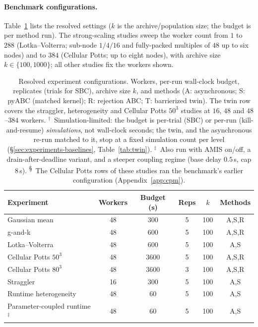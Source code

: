 \documentclass[pdflatex,sn-mathphys-num]{sn-jnl}
\theoremstyle{plain}
\theoremstyle{definition}
\begin{document}
\begin{appendices}
\paragraph{Benchmark configurations.} Table~\ref{tab:configs} lists the resolved settings ($k$ is the archive/population size; the budget is per method run). The strong-scaling studies sweep the worker count from $1$ to $288$ (Lotka--Volterra; sub-node $1/4/16$ and fully-packed multiples of $48$ up to six nodes) and to $384$ (Cellular Potts; up to eight nodes), with archive size $k\in\{100,1000\}$; all other studies fix the workers shown.

\begin{table}[t]
\caption{Resolved experiment configurations. Workers, per-run wall-clock budget, replicates (trials for SBC), archive size $k$, and methods (A: asynchronous; S: pyABC (matched kernel); R: rejection ABC; T: barrierized twin). The twin row covers the straggler, heterogeneity and Cellular Potts $50^3$ studies at $16$, $48$ and $48$--$384$ workers. $^\dagger$~Simulation-limited: the budget is per-trial (SBC) or per-run (kill-and-resume) \emph{simulations}, not wall-clock seconds; the twin, and the asynchronous re-run matched to it, stop at a fixed simulation count per level (\S\ref{sec:experiments-baselines}, Table~\ref{tab:twin}). $^\ddagger$~Also run with AMIS on/off, a drain-after-deadline variant, and a steeper coupling regime (base delay $0.5$\,s, cap $8$\,s). \textsuperscript{\S}~The Cellular Potts rows of these studies ran the benchmark's earlier configuration (Appendix~\ref{app:cpm}).}\label{tab:configs}
\centering
\begin{tabular}{@{}lccccc@{}}
\toprule
Experiment & Workers & Budget (s) & Reps & $k$ & Methods \\
\midrule
Gaussian mean          & 48 & 300  & 5   & 100 & A,S,R \\
g-and-k                & 48 & 600  & 5   & 100 & A,S,R \\
Lotka--Volterra        & 48 & 600  & 5   & 100 & A,S \\
Cellular Potts $50^3$  & 48 & 3600 & 5   & 100 & A,S,R \\
Cellular Potts $80^3$  & 48 & 3600 & 3   & 100 & A,S,R \\
Straggler              & 16 & 300  & 5   & 100 & A,S \\
Runtime heterogeneity  & 48 & 60   & 5   & 100 & A,S \\
Parameter-coupled runtime$^\ddagger$ & 48 & 60 & 5 & 100 & A,S \\

\end{tabular}
\end{table}
\end{appendices}
\end{document}
